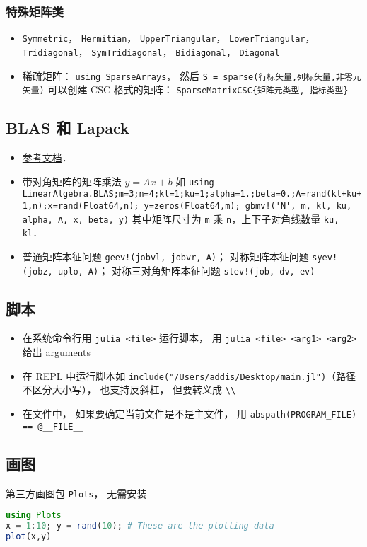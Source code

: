 \subsubsection{特殊矩阵类}
\begin{itemize}
\item \verb|Symmetric|， \verb|Hermitian|， \verb|UpperTriangular|， \verb|LowerTriangular|， \verb|Tridiagonal|， \verb|SymTridiagonal|， \verb|Bidiagonal|， \verb|Diagonal|
\item 稀疏矩阵： \verb|using SparseArrays|， 然后 \verb|S = sparse(行标矢量,列标矢量,非零元矢量)| 可以创建 CSC 格式的矩阵： \verb|SparseMatrixCSC{矩阵元类型, 指标类型}|
\end{itemize}

\subsection{BLAS 和 Lapack}
\begin{itemize}
\item \href{https://docs.julialang.org/en/v1/stdlib/LinearAlgebra/}{参考文档}．
\item 带对角矩阵的矩阵乘法 $y = Ax+b$ 如 \verb|using LinearAlgebra.BLAS;m=3;n=4;kl=1;ku=1;alpha=1.;beta=0.;A=rand(kl+ku+1,n);x=rand(Float64,n); y=zeros(Float64,m); gbmv!('N', m, kl, ku, alpha, A, x, beta, y)| 其中矩阵尺寸为 \verb|m| 乘 \verb|n|，上下子对角线数量 \verb|ku, kl|．
\item 普通矩阵本征问题 \verb|geev!(jobvl, jobvr, A)|； 对称矩阵本征问题 \verb|syev!(jobz, uplo, A)|； 对称三对角矩阵本征问题 \verb|stev!(job, dv, ev)|
\end{itemize}

\subsection{脚本}
\begin{itemize}
\item 在系统命令行用 \verb|julia <file>| 运行脚本， 用 \verb|julia <file> <arg1> <arg2>| 给出 arguments
\item 在 REPL 中运行脚本如 \verb|include("/Users/addis/Desktop/main.jl")|（路径不区分大小写）， 也支持反斜杠， 但要转义成 \verb|\\|
\item 在文件中， 如果要确定当前文件是不是主文件， 用 \verb|abspath(PROGRAM_FILE) == @__FILE__|
\end{itemize}

\subsection{画图}
第三方画图包 \verb|Plots|， 无需安装
\begin{lstlisting}[language=Julia]
using Plots
x = 1:10; y = rand(10); # These are the plotting data
plot(x,y)
\end{lstlisting}

